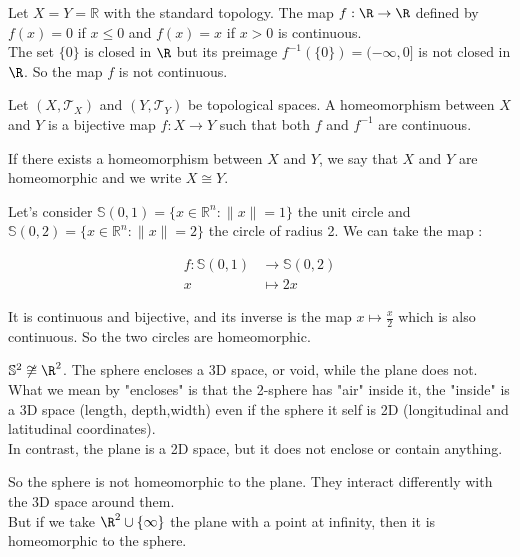 \documentclass{article}
\begin{document}
\begin{example}
    Let \(X = Y = \mathbb{R} \) with the standard topology. The map \(f: \R \to \R \) defined by \(f(x) = 0 \) if \(x \leq 0 \) and \(f(x) = x \) if \(x > 0 \) is continuous.\\

    The set \(\{0\} \) is closed in \(\R \) but its preimage \(f^{-1}(\{0\}) = (-\infty, 0] \) is not closed in \(\R \). So the map \(f\) is not continuous.\\

\end{example}



\begin{definition}[Homeomorphism]
    Let \( (X, \mathcal{T}_X) \) and \( (Y, \mathcal{T}_Y) \) be topological spaces. A homeomorphism between \(X \) and \(Y \) is a bijective map \(f: X \to Y \) such that both \(f \) and \(f^{-1} \) are continuous.

    If there exists a homeomorphism between \(X \) and \(Y \), we say that \(X \) and \(Y \) are homeomorphic and we write \(X \cong Y \).

\end{definition}

\begin{example}
    Let's consider \(\mathbb{S}(0,1) = \{x \in \mathbb{R}^n : \|x\| = 1 \} \) the unit circle and \(\mathbb{S}(0,2) = \{x \in \mathbb{R}^n : \|x\| = 2 \} \) the circle of radius 2. We can take the map : 
    
    \begin{align*}
    f: \mathbb{S}(0,1) &\longrightarrow \mathbb{S}(0,2) \\
    x &\longmapsto 2x 
    \end{align*}
    
    It is continuous and bijective, and its inverse is the map \(x \mapsto \frac{x}{2} \) which is also continuous. So the two circles are homeomorphic.\\
\end{example}

\begin{example}
    \(\mathbb{S}^2 \not \cong \R^2\). The sphere encloses a 3D space, or void, while the plane does not.\\
    What we mean by "encloses" is that the 2-sphere has "air" inside it, the "inside" is a 3D space (length, depth,width) even if the sphere it self is 2D (longitudinal and latitudinal coordinates).\\
    In contrast, the plane is a 2D space, but it does not enclose or contain anything. 

    So the sphere is not homeomorphic to the plane. They interact differently with the 3D space around them.\\

    But if we take \(\R^2 \cup \{\infty\} \) the plane with a point at infinity, then it is homeomorphic to the sphere.\\ 



\end{example}
\end{document}

